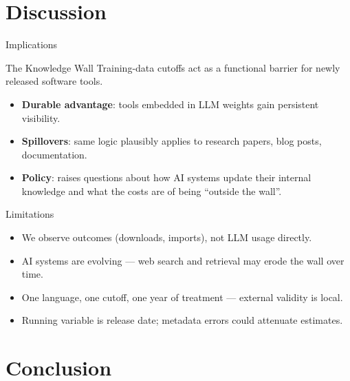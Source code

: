 \documentclass[10pt, aspectratio=169]{beamer}
\begin{document}
\section{Discussion}

\begin{frame}{Implications}
    \begin{block}{The Knowledge Wall}
        Training-data cutoffs act as a functional barrier for newly released software tools.
    \end{block}
    \begin{itemize}
        \item \textbf{Durable advantage}: tools embedded in LLM weights gain persistent visibility.
        \item \textbf{Spillovers}: same logic plausibly applies to research papers, blog posts, documentation.
        \item \textbf{Policy}: raises questions about how AI systems update their internal knowledge and what the costs are of being ``outside the wall''.
    \end{itemize}
\end{frame}

\begin{frame}{Limitations}
    \begin{itemize}
        \item We observe outcomes (downloads, imports), not LLM usage directly.
        \item AI systems are evolving --- web search and retrieval may erode the wall over time.
        \item One language, one cutoff, one year of treatment --- external validity is local.
        \item Running variable is release date; metadata errors could attenuate estimates.
    \end{itemize}
\end{frame}

\section{Conclusion}
\end{document}
